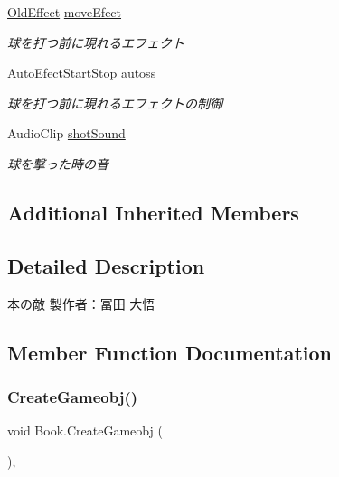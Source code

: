 \begin{DoxyCompactItemize}
\hyperlink{class_old_effect}{Old\+Effect} \hyperlink{class_book_a9dfb0d5289ac6d76729c958a82da5707}{move\+Efect}
\begin{DoxyCompactList}\small\item\em 球を打つ前に現れるエフェクト \end{DoxyCompactList}\item 
\hyperlink{class_auto_efect_start_stop}{Auto\+Efect\+Start\+Stop} \hyperlink{class_book_a11aaae4569af0471e6b5f67d4523bcf2}{autoss}
\begin{DoxyCompactList}\small\item\em 球を打つ前に現れるエフェクトの制御 \end{DoxyCompactList}\item 
Audio\+Clip \hyperlink{class_book_adf12a76c0251881fb97b7d3b4ee147f2}{shot\+Sound}
\begin{DoxyCompactList}\small\item\em 球を撃った時の音 \end{DoxyCompactList}\end{DoxyCompactItemize}
\subsection*{Additional Inherited Members}


\subsection{Detailed Description}
本の敵 製作者：冨田 大悟 



\subsection{Member Function Documentation}
\mbox{\label{class_book_afa98fd4c4380e34a2d2e231ad0836d7c}} 
\subsubsection{\texorpdfstring{Create\+Gameobj()}{CreateGameobj()}}
{\footnotesize\ttfamily void Book.\+Create\+Gameobj (\begin{DoxyParamCaption}{ }\end{DoxyParamCaption})\hspace{0.3cm}{\ttfamily [inline]}, {\ttfamily [private]}}




